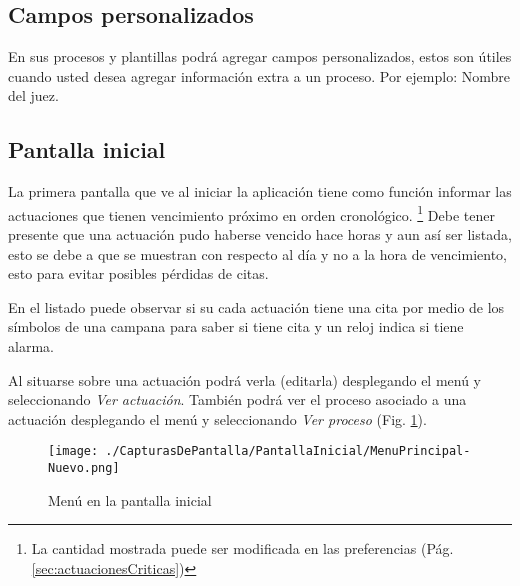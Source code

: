 \subsection{Campos personalizados}
En sus procesos y plantillas podr\'a agregar campos personalizados, estos son
\'utiles cuando usted desea agregar informaci\'on extra a un proceso. Por
ejemplo: Nombre del juez.
\subsection{Pantalla inicial}
La primera pantalla que ve al iniciar la aplicaci\'on tiene como funci\'on
informar las actuaciones que tienen vencimiento pr\'oximo en orden
cronol\'ogico.
\footnote{La cantidad mostrada puede ser modificada en las preferencias
(P\'ag. \ref{sec:actuacionesCriticas})}
Debe tener presente que una actuaci\'on pudo haberse vencido hace horas y aun
as\'i ser listada, esto se debe a que se muestran con respecto al d\'ia y no a
la hora de vencimiento, esto para evitar posibles p\'erdidas de citas.

En el listado puede observar si su cada actuaci\'on tiene una cita por medio de
los s\'imbolos de una campana para saber si tiene cita y un reloj indica si
tiene alarma.

Al situarse sobre una actuaci\'on podr\'a verla (editarla) desplegando el
men\'u \blackberry y seleccionando \emph{Ver actuaci\'on}. Tambi\'en podr\'a
ver el proceso asociado a una actuaci\'on desplegando el men\'u \blackberry y
seleccionando \emph{Ver proceso} (Fig. \ref{fig:pantallaInicialMenu}).

\begin{figure}[htb]
\begin{center}
\texttt{[image: ./CapturasDePantalla/PantallaInicial/MenuPrincipal-Nuevo.png]}
\caption{Men\'u en la pantalla inicial}\label{fig:pantallaInicialMenu}
\end{center}
\end{figure}